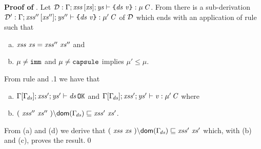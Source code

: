 \medskip
\noindent
{\bf Proof of }. 
Let ${\cal D}:{\Gamma};\mathit{xss}\,[\mathit{xs}];\mathit{ys}\vdash \texttt{\{}\mathit{ds}\ \mathit{v}\texttt{\}}:\mu\,\mathit{C}$.
From  there is a sub-derivation ${\cal D}':{\Gamma};\mathit{xss}''\,[\mathit{xs}''];\mathit{ys}''\vdash \texttt{\{}\mathit{ds}\ \mathit{v}\texttt{\}}:\mu'\,\mathit{C}$ of ${\cal D}$ which ends with an application of rule 
such that  
\begin{enumerate}[(a)]
\item $\LentLocked\ \xs=\LentLocked''\ \xs''$ and
\item $\mu\not=\texttt{imm}$ and $\mu\not=\texttt{capsule}$ implies $\mu'\leq\mu$.
\end{enumerate}
 From rule  and .1 we have that
\begin{enumerate}[(a)]\addtocounter{enumi}{2}
\item $\Gamma[\Gamma_{\!\mathit{ds}}];\mathit{xss}';\mathit{ys}'\vdash \mathit{ds}\,{\tt OK}$ and
 ${\Gamma[\Gamma_{\!\mathit{ds}}]};{\mathit{xss}'};\mathit{ys}'\vdash \mathit{v}:\mu'\,\mathit{C}$
where
  \item $\LessEq{(\ \LentLocked''\ \xs''\ ){\setminus}\dom{\TypeEnv{\decs}}}{\LentLocked'\ \xs'}$.
\end{enumerate}
From (a) and (d) we derive that $\LessEq{(\ \LentLocked\ \xs\ ){\setminus}\dom{\TypeEnv{\decs}}}{\LentLocked'\ \xs'}$ which, with (b) and (c), proves the result.\qed


